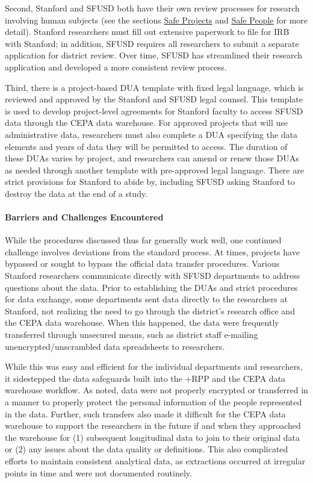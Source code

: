 \documentclass[
]{WileySix}
\begin{document}
Second, Stanford and SFUSD both have their own review processes for research involving human subjects (see the sections \protect\hyperlink{safe-projects-8}{Safe Projects} and \protect\hyperlink{safe-people-8}{Safe People} for more detail). Stanford researchers must fill out extensive paperwork to file for IRB with Stanford; in addition, SFUSD requires all researchers to submit a separate application for district review. Over time, SFUSD has streamlined their research application and developed a more consistent review process.

Third, there is a project-based DUA template with fixed legal language, which is reviewed and approved by the Stanford and SFUSD legal counsel. This template is used to develop project-level agreements for Stanford faculty to access SFUSD data through the CEPA data warehouse. For approved projects that will use administrative data, researchers must also complete a DUA specifying the data elements and years of data they will be permitted to access. The duration of these DUAs varies by project, and researchers can amend or renew those DUAs as needed through another template with pre-approved legal language. There are strict provisions for Stanford to abide by, including SFUSD asking Stanford to destroy the data at the end of a study.

\hypertarget{barriers-and-challenges-encountered}{%
\paragraph{Barriers and Challenges Encountered}\label{barriers-and-challenges-encountered}}

While the procedures discussed thus far generally work well, one continued challenge involves deviations from the standard process. At times, projects have bypassed or sought to bypass the official data transfer procedures. Various Stanford researchers communicate directly with SFUSD departments to address questions about the data. Prior to establishing the DUAs and strict procedures for data exchange, some departments sent data directly to the researchers at Stanford, not realizing the need to go through the district's research office and the CEPA data warehouse. When this happened, the data were frequently transferred through unsecured means, such as district staff e-mailing unencrypted/unscrambled data spreadsheets to researchers.

While this was easy and efficient for the individual departments and researchers, it sidestepped the data safeguards built into the +RPP\textbar{} and the CEPA data warehouse workflow. As noted, data were not properly encrypted or transferred in a manner to properly protect the personal information of the people represented in the data. Further, such transfers also made it difficult for the CEPA data warehouse to support the researchers in the future if and when they approached the warehouse for (1) subsequent longitudinal data to join to their original data or (2) any issues about the data quality or definitions. This also complicated efforts to maintain consistent analytical data, as extractions occurred at irregular points in time and were not documented routinely.
\end{document}
